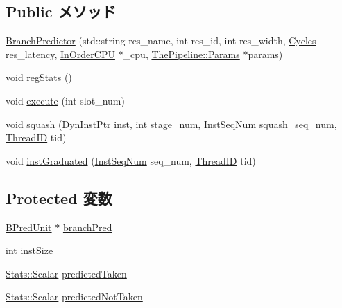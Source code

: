 \subsection*{Public メソッド}
\begin{DoxyCompactItemize}
\item 
\hyperlink{classBranchPredictor_a8df166d242ec66fcc54ae779bb1f955d}{BranchPredictor} (std::string res\_\-name, int res\_\-id, int res\_\-width, \hyperlink{classCycles}{Cycles} res\_\-latency, \hyperlink{classInOrderCPU}{InOrderCPU} $\ast$\_\-cpu, \hyperlink{namespaceThePipeline_ab62ca16eeca26566ad2422b5df4943ce}{ThePipeline::Params} $\ast$params)
\item 
void \hyperlink{classBranchPredictor_a4dc637449366fcdfc4e764cdf12d9b11}{regStats} ()
\item 
void \hyperlink{classBranchPredictor_a7b7fff82f8c9cbdb02add1346f60bb9e}{execute} (int slot\_\-num)
\item 
void \hyperlink{classBranchPredictor_a52235c5e3d912452f254dc45f1496fd2}{squash} (\hyperlink{classRefCountingPtr}{DynInstPtr} inst, int stage\_\-num, \hyperlink{inst__seq_8hh_a258d93d98edaedee089435c19ea2ea2e}{InstSeqNum} squash\_\-seq\_\-num, \hyperlink{base_2types_8hh_ab39b1a4f9dad884694c7a74ed69e6a6b}{ThreadID} tid)
\item 
void \hyperlink{classBranchPredictor_a3f5f4da90448a4c3a3c0533881fb3129}{instGraduated} (\hyperlink{inst__seq_8hh_a258d93d98edaedee089435c19ea2ea2e}{InstSeqNum} seq\_\-num, \hyperlink{base_2types_8hh_ab39b1a4f9dad884694c7a74ed69e6a6b}{ThreadID} tid)
\end{DoxyCompactItemize}
\subsection*{Protected 変数}
\begin{DoxyCompactItemize}
\item 
\hyperlink{classBPredUnit}{BPredUnit} $\ast$ \hyperlink{classBranchPredictor_adee29d0de843b42df1f1caf92d388413}{branchPred}
\item 
int \hyperlink{classBranchPredictor_a494a9a986bc62c946604f9e9047ad237}{instSize}
\item 
\hyperlink{classStats_1_1Scalar}{Stats::Scalar} \hyperlink{classBranchPredictor_ada70fcd9e8038f515744ad60fcbb2cad}{predictedTaken}
\item 
\hyperlink{classStats_1_1Scalar}{Stats::Scalar} \hyperlink{classBranchPredictor_ae27736a1ae544674fb4449cc6d8b432c}{predictedNotTaken}
\end{DoxyCompactItemize}


